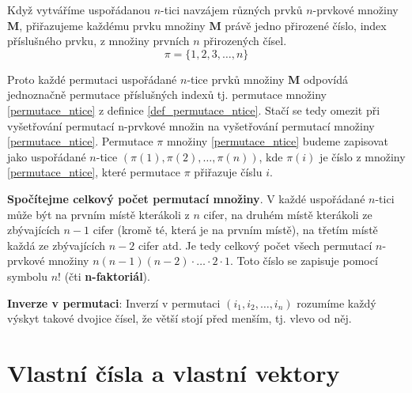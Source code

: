 {      \begin{definition}\label{def_permutace_ntice}
        Když vytváříme uspořádanou \(n\)-tici navzájem různých prvků \(n\)-prv\-ko\-vé množiny 
        \(\mathbf{M}\), přiřazujeme každému prvku množiny \(\mathbf{M}\) právě jedno přirozené 
        číslo, index příslušného prvku, z množiny prvních \(n\) přirozených čísel.
        \begin{equation}\label{permutace_ntice}
          \pi = \lbrace 1, 2, 3, \ldots, n\rbrace
        \end{equation}
      \end{definition}
  
      Proto každé permutaci uspořádané \(n\)-tice prvků množiny \(\mathbf{M}\) odpovídá jednoznačně 
      permutace příslušných indexů tj. permutace množiny \ref{permutace_ntice} z definice 
      \ref{def_permutace_ntice}. Stačí se tedy omezit při vyšetřování permutací n-prvkové množin 
      na vyšetřování permutací množiny \ref{permutace_ntice}. Permutace \(\pi\) množiny 
      \ref{permutace_ntice} budeme zapisovat jako uspořádané \(n\)-tice \(\left(\pi(1), \pi(2) 
      ,\ldots, \pi(n)\right)\), kde \(\pi(i)\) je číslo z množiny \ref{permutace_ntice}, které 
      permutace \(\pi\) přiřazuje číslu \(i\).

      \begin{example}\label{ex_celk_pocet_permutaci}
        \textbf{Spočítejme celkový počet permutací množiny}. V každé uspořádané \(n\)-tici může být 
        na prvním místě kterákoli z \(n\) cifer, na druhém místě kterákoli ze zbývajících \(n-1\) 
        cifer (kromě té, která je na prvním místě), na  třetím místě každá ze zbývajících \(n-2\) 
        cifer atd. Je tedy celkový počet všech permutací \(n\)-prvkové množiny \(n(n-1)(n-2)\cdot 
        \ldots \cdot2\cdot1\). Toto číslo se zapisuje pomocí symbolu \(n!\) (čti 
        \textbf{n-faktoriál}).
      \end{example}
      
      \begin{definition}\label{def_inv_perm}\textbf{Inverze v permutaci}:
        Inverzí v permutaci \(\left(i_1,i_2,…,i_n \right)\) rozumíme každý výskyt takové dvojice 
        čísel, že větší stojí před menším, tj. vlevo od něj.
      \end{definition}  
   
  \section{Vlastní čísla a vlastní vektory}
}
